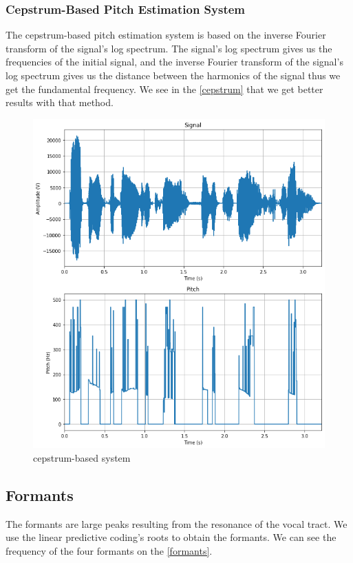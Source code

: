 \documentclass[]{article}
\begin{document}
\subsubsection{Cepstrum-Based Pitch Estimation System}
The cepstrum-based pitch estimation system is based on the inverse Fourier transform of the signal's log spectrum.
The signal's log spectrum gives us the frequencies of the initial signal, and the inverse Fourier transform of the signal's log
spectrum gives us the distance between the harmonics of the signal thus we get the fundamental frequency.
We see in the \autoref{cepstrum} that we get better results with that method.

\begin{figure}[H]
    \centering
    \caption{\label{cepstrum}cepstrum-based system}
    \includegraphics[scale=0.5]{images/cepstrum_pitch.png}
\end{figure}

\subsection{Formants}
The formants are large peaks resulting from the resonance of the vocal tract. We use the linear predictive
coding's roots to obtain the formants. We can see the frequency of the four formants on the \autoref{formants}.
\end{document}
